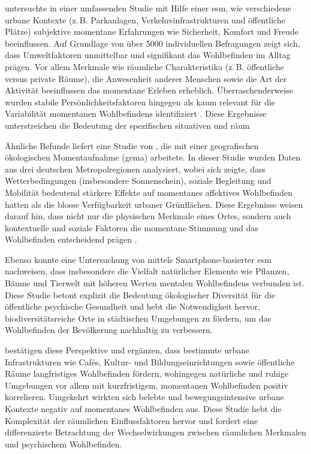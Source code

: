 \textcite{birenboimInfluenceUrbanEnvironments2018} untersuchte in einer umfassenden Studie mit Hilfe einer \acrfull{esm}, wie verschiedene urbane Kontexte (z.\,B. Parkanlagen, Verkehrsinfrastrukturen und öffentliche Plätze) subjektive momentane Erfahrungen wie Sicherheit, Komfort und Freude beeinflussen. Auf Grundlage von über 5000 individuellen Befragungen zeigt sich, dass Umweltfaktoren unmittelbar und signifikant das Wohlbefinden im Alltag prägen. Vor allem Merkmale wie räumliche Charakteristika (z.\,B. öffentliche versus private Räume), die Anwesenheit anderer Menschen sowie die Art der Aktivität beeinflussen das momentane Erleben erheblich. Überraschenderweise wurden stabile Persönlichkeitsfaktoren hingegen als kaum relevant für die Variabilität momentanen Wohlbefindens identifiziert \parencite{birenboimInfluenceUrbanEnvironments2018}. Diese Ergebnisse unterstreichen die Bedeutung der spezifischen situativen und räum

Ähnliche Befunde liefert eine Studie von \textcite{mascherekMeadowsAsphaltRoad2025}, die mit einer geografischen ökologischen Momentaufnahme (\acrfull{gema}) arbeitete. In dieser Studie wurden Daten aus drei deutschen Metropolregionen analysiert, wobei sich zeigte, dass Wetterbedingungen (insbesondere Sonnenschein), soziale Begleitung und Mobilität bedeutend stärkere Effekte auf momentanes affektives Wohlbefinden hatten als die blosse Verfügbarkeit urbaner Grünflächen. Diese Ergebnisse weisen darauf hin, dass nicht nur die physischen Merkmale eines Ortes, sondern auch kontextuelle und soziale Faktoren die momentane Stimmung und das Wohlbefinden entscheidend prägen \parencite{mascherekMeadowsAsphaltRoad2025}.

Ebenso konnte eine Untersuchung von \textcite{hammoudSmartphonebasedEcologicalMomentary2024} mittels Smartphone-basierter \gls{esm} nachweisen, dass insbesondere die Vielfalt natürlicher Elemente wie Pflanzen, Bäume und Tierwelt mit höheren Werten mentalen Wohlbefindens verbunden ist. Diese Studie betont explizit die Bedeutung ökologischer Diversität für die öffentliche psychische Gesundheit und hebt die Notwendigkeit hervor, biodiversitätsreiche Orte in städtischen Umgebungen zu fördern, um das Wohlbefinden der Bevölkerung nachhaltig zu verbessern.

\textcite{chenPerceivedUrbanEnvironment2025} bestätigen diese Perspektive und ergänzen, dass bestimmte urbane Infrastrukturen wie Cafés, Kultur- und Bildungseinrichtungen sowie öffentliche Räume langfristiges Wohlbefinden fördern, wohingegen natürliche und ruhige Umgebungen vor allem mit kurzfristigem, momentanen Wohlbefinden positiv korrelieren. Umgekehrt wirkten sich belebte und bewegungsintensive urbane Kontexte negativ auf momentanes Wohlbefinden aus. Diese Studie hebt die Komplexität der räumlichen Einflussfaktoren hervor und fordert eine differenzierte Betrachtung der Wechselwirkungen zwischen räumlichen Merkmalen und psychischem Wohlbefinden.

